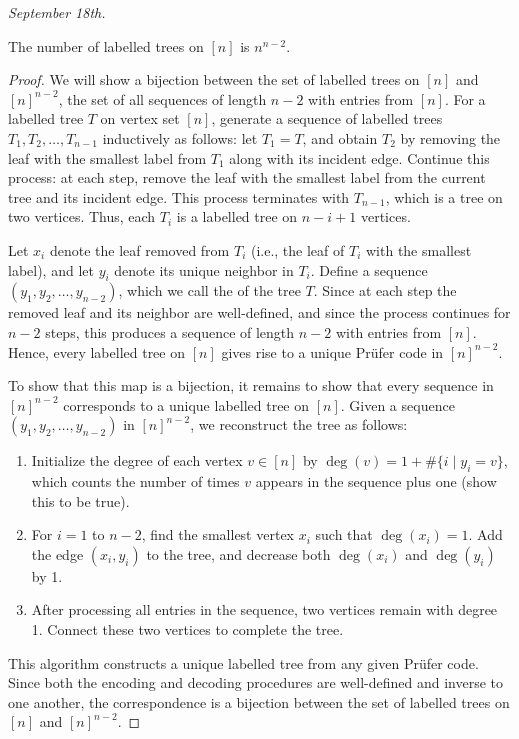 \textit{September 18th.}

\begin{theorem}
    The number of labelled trees on $[n]$ is $n^{n-2}$.
\end{theorem}
\begin{proof}
    We will show a bijection between the set of labelled trees on $[n]$ and $[n]^{n-2}$, the set of all sequences of length $n-2$ with entries from $[n]$. For a labelled tree $T$ on vertex set $[n]$, generate a sequence of labelled trees $T_1, T_2, \ldots, T_{n-1}$ inductively as follows: let $T_1 = T$, and obtain $T_2$ by removing the leaf with the smallest label from $T_1$ along with its incident edge. Continue this process: at each step, remove the leaf with the smallest label from the current tree and its incident edge. This process terminates with $T_{n-1}$, which is a tree on two vertices. Thus, each $T_i$ is a labelled tree on $n - i + 1$ vertices.

    Let $x_i$ denote the leaf removed from $T_i$ (i.e., the leaf of $T_i$ with the smallest label), and let $y_i$ denote its unique neighbor in $T_i$. Define a sequence $(y_1, y_2, \ldots, y_{n-2})$, which we call the  of the tree $T$. Since at each step the removed leaf and its neighbor are well-defined, and since the process continues for $n - 2$ steps, this produces a sequence of length $n - 2$ with entries from $[n]$. Hence, every labelled tree on $[n]$ gives rise to a unique Prüfer code in $[n]^{n-2}$.

    To show that this map is a bijection, it remains to show that every sequence in $[n]^{n-2}$ corresponds to a unique labelled tree on $[n]$. Given a sequence $(y_1, y_2, \ldots, y_{n-2})$ in $[n]^{n-2}$, we reconstruct the tree as follows:
    \begin{enumerate}
        \item Initialize the degree of each vertex $v \in [n]$ by $\deg(v) = 1 + \#\{i \mid y_i = v\}$, which counts the number of times $v$ appears in the sequence plus one (show this to be true).
        \item For $i = 1$ to $n - 2$, find the smallest vertex $x_i$ such that $\deg(x_i) = 1$. Add the edge $(x_i, y_i)$ to the tree, and decrease both $\deg(x_i)$ and $\deg(y_i)$ by 1.
        \item After processing all entries in the sequence, two vertices remain with degree 1. Connect these two vertices to complete the tree.
    \end{enumerate}

    This algorithm constructs a unique labelled tree from any given Prüfer code. Since both the encoding and decoding procedures are well-defined and inverse to one another, the correspondence is a bijection between the set of labelled trees on $[n]$ and $[n]^{n-2}$.
\end{proof}
